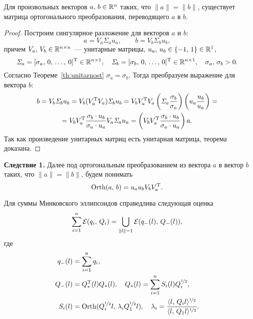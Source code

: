 \begin{assertion}
        Для произвольных векторов $a,\,b\in\mathbb{R}^{n}$ таких, что $\|a\| = \|b\|$, существует матрица ортогонального преобразования, переводящего $a$ в $b$.
\end{assertion}
\begin{proof}
        
        Построим сингулярное разложение для векторов $a$ и $b$:
$$
        a = V_a \mathit{\Sigma}_a u_a,
        \qquad
        b = V_b \mathit{\Sigma}_b u_b,
$$        
причем $V_a,\,V_b \in \mathbb{R}^{n \times n}$~--- унитарные матрицы, $u_a,\,u_b\in\{-1,\,1\}\in\mathbb{R}^1$,
$$
        \mathit{\Sigma}_a = [\sigma_a,\,0,\,\ldots,\,0]^\mathrm{T}\in\mathbb{R}^{n \times 1},\quad
        \mathit{\Sigma}_b = [\sigma_b,\,0,\,\ldots,\,0]^\mathrm{T}\in\mathbb{R}^{n \times 1},\quad
        \sigma_a,\,\sigma_b > 0.
$$
Согласно Теореме~\ref{th:unitarnost} $\sigma_a = \sigma_b$.
Тогда преобразуем выражение для вектора $b$:
\begin{multline*}
        b
        =
        V_b \mathit{\Sigma}_b u_b
        =
        V_b (V_a^\mathrm{T} V_a)\mathit{\Sigma}_b u_b
        =
        V_bV_a^\mathrm{T} V_a \left( \mathit{\Sigma}_a \frac{\sigma_b}{\sigma_a} \right) \left( u_a\frac{u_b}{u_a} \right)
        =\\=
        V_bV_a^\mathrm{T} \frac{\sigma_b\cdot u_b}{\sigma_a\cdot u_a}V_a\mathit{\Sigma}_au_a
        =
        \left(V_b V_a^\mathrm{T} \frac{\sigma_b\cdot u_b}{\sigma_a\cdot u_a}\right)a.
\end{multline*}
Так как произведение унитарных матриц есть унитарная матрица, теорема доказана.

\end{proof}

\textbf{Следствие 1.} Далее под ортогональным преобразованием из вектора $a$ в вектор $b$ таких, что $\|a\| = \|b\|$, будем понимать
$$
        \mathrm{Orth}(a,\,b) = u_au_bV_bV_a^\mathrm{T}.
$$

\begin{assertion}
        Для суммы Минковского эллипсоидов справедлива следующая оценка
$$
        \sum_{i=1}^n \mathcal{E}(q_i,\,Q_i) = 
        \bigcup\limits_{\|l\|=1}\mathcal{E}(q_-(l),\,Q_-(l)),
$$
        где
$$
        \begin{aligned}
q_-(l) &= \sum_{i=1}^n q_i,
\\
Q_-(l) &= Q_*^\mathrm{T}(l) Q_*(l),
\quad
Q_*(l) = \sum_{i=1}^{n}S_i(l)Q_i^{\nicefrac12},
\\
S_i(l) &= \mathrm{Orth}(Q_i^{\nicefrac12}l,\,\lambda_iQ_1^{\nicefrac12}l),
\quad
\lambda_i = \frac{\langle l,\,Q_il\rangle^{\nicefrac12}}{\langle l,\,Q_1l\rangle^{\nicefrac12}}.
        \end{aligned}
$$
\end{assertion}

